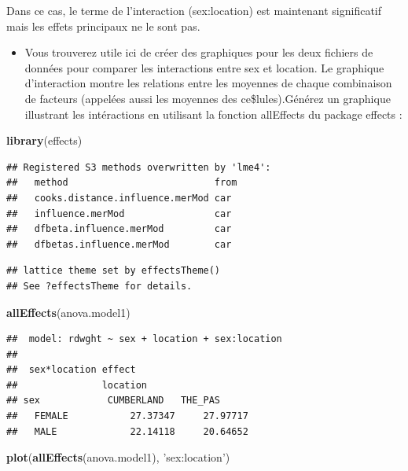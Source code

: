 \documentclass[12pt,]{book}
\newenvironment{Shaded}{\begin{snugshade}}{\end{snugshade}}
\newcommand{\KeywordTok}[1]{\textcolor[rgb]{0.13,0.29,0.53}{\textbf{#1}}}
\newcommand{\NormalTok}[1]{#1}
\newcommand{\StringTok}[1]{\textcolor[rgb]{0.31,0.60,0.02}{#1}}
\providecommand{\tightlist}{%
  \setlength{\itemsep}{0pt}\setlength{\parskip}{0pt}}
\begin{document}
Dans ce cas, le terme de l'interaction (sex:location) est maintenant significatif mais les effets principaux ne le sont pas.

\begin{itemize}
\tightlist
\item
  Vous trouverez utile ici de créer des graphiques pour les deux fichiers de données pour comparer les interactions entre sex et location. Le graphique d'interaction montre les relations entre les moyennes de chaque combinaison de facteurs (appelées aussi les moyennes des ce\$lules).Générez un graphique illustrant les intéractions en utilisant la fonction allEffects du package effects :
\end{itemize}

\begin{Shaded}
\begin{Highlighting}[]
\KeywordTok{library}\NormalTok{(effects)}
\end{Highlighting}
\end{Shaded}

\begin{verbatim}
## Registered S3 methods overwritten by 'lme4':
##   method                          from
##   cooks.distance.influence.merMod car 
##   influence.merMod                car 
##   dfbeta.influence.merMod         car 
##   dfbetas.influence.merMod        car
\end{verbatim}

\begin{verbatim}
## lattice theme set by effectsTheme()
## See ?effectsTheme for details.
\end{verbatim}

\begin{Shaded}
\begin{Highlighting}[]
\KeywordTok{allEffects}\NormalTok{(anova.model1)}
\end{Highlighting}
\end{Shaded}

\begin{verbatim}
##  model: rdwght ~ sex + location + sex:location
## 
##  sex*location effect
##               location
## sex            CUMBERLAND   THE_PAS     
##   FEMALE           27.37347     27.97717
##   MALE             22.14118     20.64652
\end{verbatim}

\begin{Shaded}
\begin{Highlighting}[]
\KeywordTok{plot}\NormalTok{(}\KeywordTok{allEffects}\NormalTok{(anova.model1), }\StringTok{'sex:location'}\NormalTok{)}
\end{Highlighting}
\end{Shaded}
\end{document}
